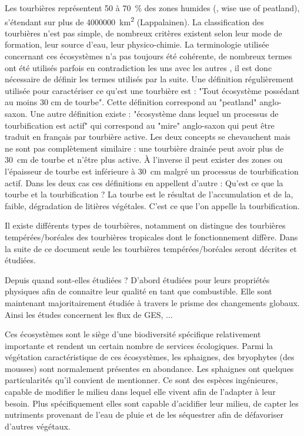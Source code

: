Les tourbières représentent 50 à \SI{70}{\percent} des zones humides (\cite{francez2000}, wise use of peatland), s'étendant sur plus de \SI{4000000}{\square\km} (Lappalainen).
La classification des tourbières n'est pas simple, de nombreux critères existent selon leur mode de formation, leur source d'eau, leur physico-chimie.
La terminologie utilisée concernant ces écosystèmes n'a pas toujours été cohérente, de nombreux termes ont été utilisés parfois en contradiction les uns avec les autres \cite{joosten2002}, il est donc nécessaire de définir les termes utilisés par la suite. 
Une définition régulièrement utilisée pour caractériser ce qu'est une tourbière est : "Tout écosystème possédant au moins 30 cm de tourbe".
Cette définition correspond au "peatland" anglo-saxon.
Une autre définition existe  : "écosystème dans lequel un processus de tourbification est actif" qui correspond au "mire" anglo-saxon qui peut être traduit en français par tourbière active.
Les deux concepts se chevauchent mais ne sont pas complètement similaire : une tourbière drainée peut avoir plus de \SI{30}{cm} de tourbe et n'être plus active.
À l'inverse il peut exister des zones ou l'épaisseur de tourbe est inférieure à \SI{30}{cm} malgré un processus de tourbification actif.
Dans les deux cas ces définitions en appellent d'autre : Qu'est ce que la tourbe et la tourbification ?
La tourbe est le résultat de l'accumulation et de la, faible, dégradation de litières végétales.
C'est ce que l'on appelle la tourbification.

Il existe différents types de tourbières, notamment on distingue des tourbières tempérées/boréales des tourbières tropicales dont le fonctionnement diffère.
Dans la suite de ce document seule les tourbières tempérées/boréales seront décrites et étudiées.

Depuis quand sont-elles étudiées ?
D'abord étudiées pour leurs propriétés physiques afin de connaitre leur qualité en tant que combustible.
Elle sont maintenant majoritairement étudiée à travers le prisme des changements globaux.
Ainsi les études concernent les flux de GES, ...

Ces écosystèmes sont le siège d'une biodiversité spécifique relativement importante et rendent un certain nombre de services écologiques.
Parmi la végétation caractéristique de ces écosystèmes, les sphaignes, des bryophytes (des mousses) sont normalement présentes en abondance.
Les sphaignes ont quelques particularités qu'il convient de mentionner.
Ce sont des espèces ingénieures, capable de modifier le milieu dans lequel elle vivent afin de l'adapter à leur besoin.
Plus spécifiquement elles sont capable d'acidifier leur milieu, de capter les nutriments provenant de l'eau de pluie et de les séquestrer afin de défavoriser d'autres végétaux.

